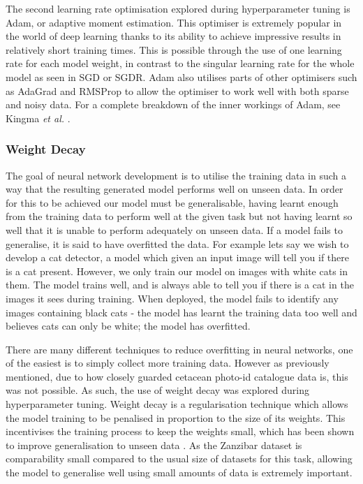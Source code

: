 The second learning rate optimisation explored during hyperparameter tuning is Adam, or adaptive moment estimation. This optimiser is extremely popular in the world of deep learning thanks to its ability to achieve impressive results in relatively short training times. This is possible through the use of one learning rate for each model weight, in contrast to the singular learning rate for the whole model as seen in SGD or SGDR. Adam also utilises parts of other optimisers such as AdaGrad \cite{duchi_adaptive_2011} and RMSProp \cite{tieleman_lecture_2012} to allow the optimiser to work well with both sparse and noisy data. For a complete breakdown of the inner workings of Adam, see Kingma \textit{et al. }\cite{kingma_adam:_2014}. 

\subsubsection{Weight Decay}\label{ch:cetDet,sec:ModelSelection,sub:TrainingHyperparameters,subsub:WeightDecay}

The goal of neural network development is to utilise the training data in such a way that the resulting generated model performs well on unseen data. In order for this to be achieved our model must be generalisable, having learnt enough from the training data to perform well at the given task but not having learnt so well that it is unable to perform adequately on unseen data. If a model fails to generalise, it is said to have overfitted the data. For example lets say we wish to develop a cat detector, a model which given an input image will tell you if there is a cat present. However, we only train our model on images with white cats in them. The model trains well, and is always able to tell you if there is a cat in the images it sees during training. When deployed, the model fails to identify any images containing black cats - the model has learnt the training data too well and believes cats can only be white; the model has overfitted. 

There are many different techniques to reduce overfitting in neural networks, one of the easiest is to simply collect more training data. However as previously mentioned, due to how closely guarded cetacean photo-id catalogue data is, this was not possible. As such, the use of weight decay was explored during hyperparameter tuning. Weight decay is a regularisation technique which allows the model training to be penalised in proportion to the size of its weights. This incentivises the training process to keep the weights small, which has been shown to improve generalisation to unseen data \cite{krogh_simple_1991}. As the Zanzibar dataset is comparability small compared to the usual size of datasets for this task, allowing the model to generalise well using small amounts of data is extremely important.

